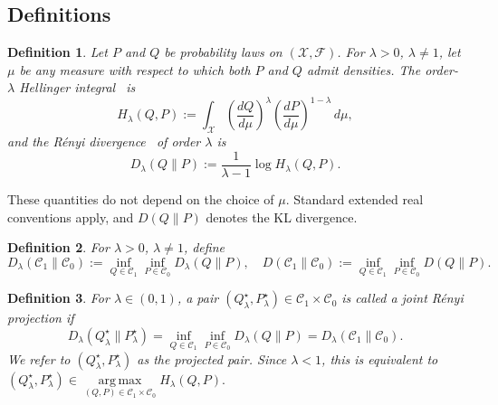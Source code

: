 \documentclass[journal,10pt,draftclsnofoot,onecolumn]{IEEEtran}
\newtheorem{definition}{Definition}
\begin{document}
\subsection{Definitions}
\begin{definition} 
Let $P$ and $Q$ be probability laws on $(\mathcal X,\mathcal F)$. For $\lambda>0$, $\lambda\neq1$, let $\mu$ be any measure with respect to which both $P$ and $Q$ admit densities. The order-$\lambda$ Hellinger integral~\cite{van2014renyi} is
\begin{equation}
H_\lambda(Q,P):=\int_{\mathcal X}\left(\frac{dQ}{d\mu}\right)^\lambda\left(\frac{dP}{d\mu}\right)^{1-\lambda}\,d\mu,
\label{eq:hellinger-integral}
\end{equation}
and the R\'enyi divergence~\cite{van2014renyi} of order $\lambda$ is
\begin{equation}
D_\lambda(Q\|P):=\frac{1}{\lambda-1}\log H_\lambda(Q,P).
\label{eq:renyi-divergence-definition}
\end{equation}
\end{definition}
These quantities do not depend on the choice of $\mu$. Standard extended real conventions apply, and $D(Q\|P)$ denotes the KL divergence.
\begin{definition}
For $\lambda>0$, $\lambda\neq1$, define
\begin{equation*}
D_\lambda(\mathcal C_1\|\mathcal C_0):=\inf_{Q\in\mathcal C_1} \inf_{P\in\mathcal C_0}D_\lambda(Q\|P), \quad D(\mathcal C_1\|\mathcal C_0):= \inf_{Q\in\mathcal C_1} \inf_{P\in\mathcal C_0} D(Q\|P).
\end{equation*}
\end{definition}

\begin{definition}
For $\lambda \in (0,1)$, a pair $(Q_\lambda^\star,P_\lambda^\star) \in\mathcal C_1\times\mathcal C_0$ is called a joint R\'enyi projection if
\begin{equation*}
D_\lambda(Q_\lambda^\star\|P_\lambda^\star)=\inf_{Q\in\mathcal C_1} \inf_{P\in\mathcal C_0} D_\lambda(Q\|P)= D_\lambda(\mathcal C_1\|\mathcal C_0).
\end{equation*}
We refer to $(Q_\lambda^\star,P_\lambda^\star)$ as the \textit{projected pair}. Since $\lambda<1$, this is equivalent to $(Q_\lambda^\star,P_\lambda^\star) \in \operatorname*{arg\,max}\limits_{(Q,P)\in\mathcal C_1\times\mathcal C_0} H_\lambda(Q,P).$
\end{definition}
\end{document}
